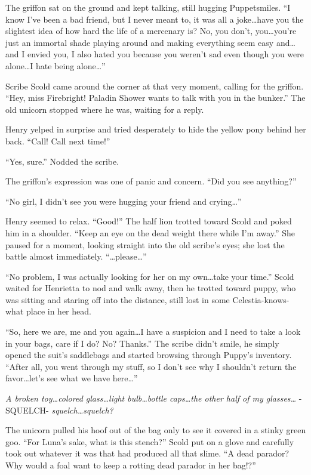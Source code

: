 The griffon sat on the ground and kept talking, still hugging Puppetsmiles. ``I know I've been a bad friend, but I never meant to, it was all a joke\dots have you the slightest idea of how hard the life of a mercenary is? No, you don't, you\dots you're just an immortal shade playing around and making everything seem easy and\dots and I envied you, I also hated you because you weren't sad even though you were alone\dots I hate being alone\dots''

Scribe Scold came around the corner at that very moment, calling for the griffon. ``Hey, miss Firebright! Paladin Shower wants to talk with you in the bunker.'' The old unicorn stopped where he was, waiting for a reply.

Henry yelped in surprise and tried desperately to hide the yellow pony behind her back. ``Call! Call next time!''

``Yes, sure.'' Nodded the scribe.

The griffon's expression was one of panic and concern. ``Did you see anything?''

``No girl, I didn't see you were hugging your friend and crying\dots''

Henry seemed to relax. ``Good!'' The half lion trotted toward Scold and poked him in a shoulder. ``Keep an eye on the dead weight there while I'm away.'' She paused for a moment, looking straight into the old scribe's eyes; she lost the battle almost immediately. ``\dots please\dots''

``No problem, I was actually looking for her on my own\dots take your time.'' Scold waited for Henrietta to nod and walk away, then he trotted toward puppy, who was sitting and staring off into the distance, still lost in some Celestia-knows-what place in her head.

``So, here we are, me and you again\dots I have a suspicion and I need to take a look in your bags, care if I do? No? Thanks.'' The scribe didn't smile, he simply opened the suit's saddlebags and started browsing through Puppy's inventory. ``After all, you went through my stuff, so I don't see why I shouldn't return the favor\dots let's see what we have here\dots''

\emph{A broken toy\dots colored glass\dots light bulb\dots bottle caps\dots the other half of my glasses\dots} -SQUELCH- \emph{squelch\dots squelch?}

The unicorn pulled his hoof out of the bag only to see it covered in a stinky green goo. ``For Luna's sake, what is this stench?'' Scold put on a glove and carefully took out whatever it was that had produced all that slime. ``A dead parador? Why would a foal want to keep a rotting dead parador in her bag!?''

